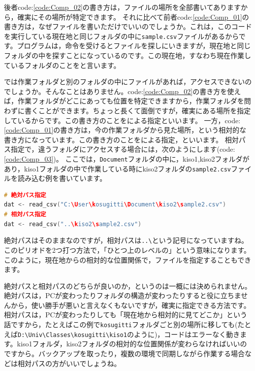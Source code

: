 \documentclass{ltjsbook}
\begin{document}
後者code:\ref{code:Comp_02}の書き方は，ファイルの場所を全部書いてありますから，確実にその場所が特定できます。
それに比べて前者code:\ref{code:Comp_01}の書き方は，なぜファイルを書いただけでいいのでしょうか。これは，このコードを実行している現在地と同じフォルダの中に\verb|sample.csv|ファイルがあるからです。プログラムは，命令を受けるとファイルを探しにいきますが，現在地と同じフォルダの中を探すことになっているのです。この現在地，すなわち現在作業しているフォルダのことをと言います。

では作業フォルダと別のフォルダの中にファイルがあれば，アクセスできないのでしょうか。そんなことはありません。code:\ref{code:Comp_02}の書き方を使えば，作業フォルダがどこにあっても位置を特定できますから，作業フォルダを問わずに書くことができます。ちょっと長くて面倒ですが，確実にある場所を指定しているからです。この書き方のことをによる指定といいます。
一方，code:\ref{code:Comp_01}の書き方は，今の作業フォルダから見た場所，という相対的な書き方になっています。この書き方のことをによる指定，といいます。
相対パス指定で，違うフォルダにアクセスする場合には，次のようにします(code:\ref{code:Comp_03})。
ここでは，\verb|Document|フォルダの中に，kiso1,kiso2フォルダがあり，kiso1フォルダの中で作業している時にkiso2フォルダの\verb|sample2.csv|ファイルを読み込む例を書いています。

\begin{lstlisting}[language=c++,label={code:Comp_03},caption={絶対パスで読み込む}]
# 絶対パス指定
dat <- read_csv("C:\User\kosugitti\Document\kiso2\sample2.csv")
# 相対パス指定
dat <- read_csv("..\kiso2\sample2.csv")
\end{lstlisting}

絶対パスはそのままなのですが，相対パスは\verb|..\|という記号になっていますね。このピリオドを2つ打つ方法で，「ひとつ上のレベルの」という意味になります。このように，現在地からの相対的な位置関係で，ファイルを指定することもできます。

絶対パスと相対パスのどちらが良いのか，というのは一概には決められません。
絶対パスは，PCが変わったりフォルダの構造が変わったりすると役に立ちませんから，使い勝手が悪いと言えなくもないですが，確実に指定できる方法です。
相対パスは，PCが変わったりしても「現在地から相対的に見てどこか」という話ですから，たとえばこの例で\verb|kosugitti|フォルダごと別の場所に移しても(たとえば\verb|D:\Univ\Classes\kosugitti\kiso1|のように)，コードはエラーなく動きます。kiso1フォルダ，kiso2フォルダの相対的な位置関係が変わらなければいいのですから。バックアップを取ったり，複数の環境で同期しながら作業する場合などは相対パスの方がいいでしょうね。
\end{document}
